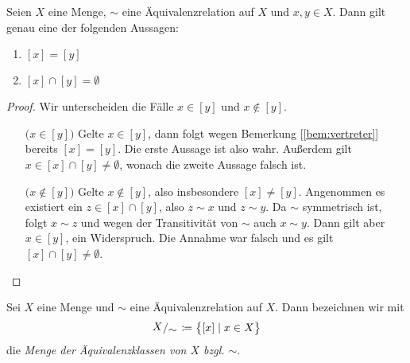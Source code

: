 \begin{bem}
\label{bem:disjunkt}

  Seien $X$ eine Menge, $\sim$ eine Äquivalenzrelation auf $X$ und $x,y\in
  X$. Dann gilt genau eine der folgenden Aussagen:

  \begin{enumerate}
    \item $[x] = [y]$
    \item $[x] \cap [y] = \emptyset$
  \end{enumerate}

  \begin{proof}

    Wir unterscheiden die Fälle $x\in [y]$ und $x\notin [y]$.
    \begin{itemize}

    \item[\tiny{$\big(x\in {[y]}\big)$}] Gelte $x\in [y]$, dann folgt wegen
      Bemerkung [\ref{bem:vertreter}] bereits $[x]=[y]$. Die erste Aussage
      ist also wahr. Außerdem gilt $x\in [x] \cap [y] \neq \emptyset$,
      wonach die zweite Aussage falsch ist.

    \item[\tiny{$\big(x\notin {[y]}\big)$}] Gelte $x\notin [y]$, also
      insbesondere $[x]\neq [y]$. Angenommen es existiert ein
      $z\in [x]\cap [y]$, also $z \sim x$ und $z \sim y$. Da $\sim$
      symmetrisch ist, folgt $x\sim z$ und wegen der Transitivität von
      $\sim$ auch $x\sim y$. Dann gilt aber $x\in [y]$, ein
      Widerspruch. Die Annahme war falsch und es gilt
      $[x] \cap [y] \neq \emptyset$.

    \end{itemize}
    
  \end{proof}
  
\end{bem}


\begin{defin}

  Sei $X$ eine Menge und $\sim$ eine Äquivalenzrelation auf $X$. Dann bezeichnen
  wir mit
  \begin{align*}
    \quotspace{X}{\sim} \ceq \big\{ [x] \mid x\in X \big\}
  \end{align*}
  die \emph{Menge der Äquivalenzklassen von $X$ bzgl. $\sim$}.
  

\end{defin}


